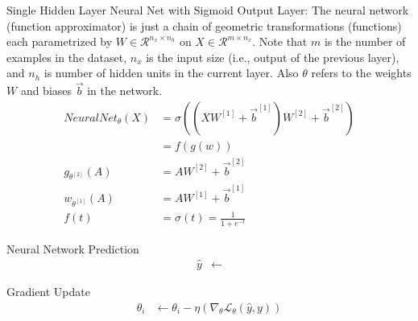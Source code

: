 \documentclass{article}
\begin{document}
Single Hidden Layer Neural Net with Sigmoid Output Layer: The neural network
(function approximator) is just a chain of geometric transformations (functions)
each parametrized by $W \in \mathcal{R}^{n_x \times n_h}$
on $X \in \mathcal{R}^{m \times n_x}$.
Note that $m$ is the number of examples
in the dataset, $n_x$ is the input size (i.e., output of the previous layer),
and $n_h$ is number of hidden units in the current layer. Also $\theta$ refers
to the weights $W$ and biases $\vec{b}$ in the network.
\begin{equation}
	\begin{aligned}
		NeuralNet_{\theta}(X) & =
		\sigma((XW^{[1]}
		+ \vec{b}^{[1]})W^{[2]} + \vec{b}^{[2]})                   \\
		                      & = f(g(w))                          \\
		g_{\theta^{[2]}}(A)   & = AW^{[2]} + \vec{b}^{[2]}         \\
		w_{\theta^{[1]}}(A)   & = AW^{[1]} + \vec{b}^{[1]}         \\
		f(t)                  & = \sigma(t) = \frac{1}{1 + e^{-t}}
	\end{aligned}
\end{equation}


Neural Network Prediction
\begin{align}
	\hat{y} & \gets
\end{align}

Gradient Update
\begin{align}
	\theta_i & \gets \theta_i - \eta (\nabla_\theta \mathcal{L}_{\theta}(\hat{y}, y))
\end{align}
\end{document}
